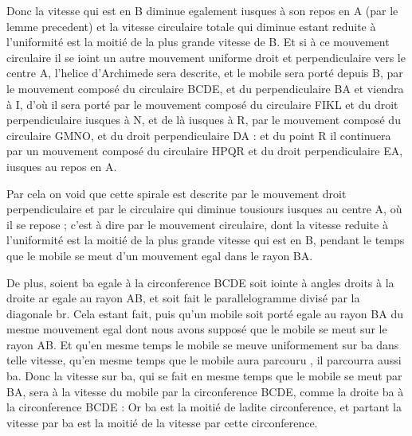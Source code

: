 \documentclass[11pt,a4paper]{article}
\begin{document}
Donc la vitesse qui est en B diminue \struck{\ill{}} egalement  iusques à son repos en A (par le lemme precedent) et la vitesse circulaire totale qui diminue estant reduite à l'uniformité est la moitié de la plus grande vitesse de B. Et si à ce mouvement circulaire  il se ioint un autre mouvement \struck{\ill{}} uniforme droit et perpendiculaire vers le centre A, l'helice d'Archimede sera descrite, et le mobile sera porté depuis B, par \struck{\ill{}} le mouvement composé du circulaire \struck{\ill{}} BCDE, et du perpendiculaire BA et viendra à I, d'où il sera porté par le mouvement composé du circulaire FIKL et du droit perpendiculaire  iusques à N, et de là iusques à R, par le mouvement composé \struck{\ill{}} du circulaire GMNO, et du droit perpendiculaire DA : et  du point R il \struck{\ill{}} continuera par un mouvement composé du circulaire HPQR et du droit perpendiculaire EA, iusques au repos en A.

Par cela on void que cette spirale est descrite par le mouvement  droit perpendiculaire et par le circulaire qui diminue tousiours iusques au centre A, où il se repose ; c'est à dire par le mouvement circulaire, dont la vitesse reduite à l'uniformité est la moitié de la plus grande vitesse qui est en B, \struck{\ill{}} pendant le temps que le mobile se meut d'un mouvement egal dans le rayon BA.

De plus, soient   ba egale à la circonference  BCDE soit iointe à angles droits à la droite ar egale au rayon AB, et soit fait le parallelogramme  divisé par la diagonale br. Cela estant fait, puis qu'un mobile \struck{\ill{}} soit porté    egale au rayon BA du mesme mouvement egal dont nous avons supposé que le mobile se meut sur le rayon AB. Et qu'en mesme temps le mobile se meuve uniformement sur ba dans telle vitesse, qu'en mesme temps que le mobile aura parcouru , il parcourra aussi ba. Donc la vitesse sur ba, qui se fait en mesme temps que le mobile se meut par BA, sera à la vitesse du mobile par la circonference BCDE, comme la droite ba à la circonference BCDE :  Or ba est la moitié de ladite circonference, et partant la vitesse par ba est la moitié de la vitesse par cette circonference.
\end{document}
